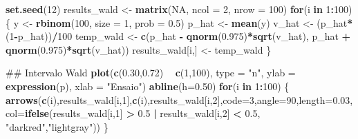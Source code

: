 \documentclass[10pt,a4paper]{book}
\newenvironment{Shaded}{\begin{snugshade}}{\end{snugshade}}
\newcommand{\KeywordTok}[1]{\textcolor[rgb]{0.13,0.29,0.53}{\textbf{#1}}}
\newcommand{\DataTypeTok}[1]{\textcolor[rgb]{0.13,0.29,0.53}{#1}}
\newcommand{\DecValTok}[1]{\textcolor[rgb]{0.00,0.00,0.81}{#1}}
\newcommand{\FloatTok}[1]{\textcolor[rgb]{0.00,0.00,0.81}{#1}}
\newcommand{\StringTok}[1]{\textcolor[rgb]{0.31,0.60,0.02}{#1}}
\newcommand{\OtherTok}[1]{\textcolor[rgb]{0.56,0.35,0.01}{#1}}
\newcommand{\ControlFlowTok}[1]{\textcolor[rgb]{0.13,0.29,0.53}{\textbf{#1}}}
\newcommand{\OperatorTok}[1]{\textcolor[rgb]{0.81,0.36,0.00}{\textbf{#1}}}
\newcommand{\NormalTok}[1]{#1}
\begin{document}
\begin{Shaded}
\begin{Highlighting}[]
\KeywordTok{set.seed}\NormalTok{(}\DecValTok{12}\NormalTok{)}
\NormalTok{results_wald <-}\StringTok{ }\KeywordTok{matrix}\NormalTok{(}\OtherTok{NA}\NormalTok{, }\DataTypeTok{ncol =} \DecValTok{2}\NormalTok{, }\DataTypeTok{nrow =} \DecValTok{100}\NormalTok{)}
\ControlFlowTok{for}\NormalTok{(i }\ControlFlowTok{in} \DecValTok{1}\OperatorTok{:}\DecValTok{100}\NormalTok{) \{}
\NormalTok{  y <-}\StringTok{ }\KeywordTok{rbinom}\NormalTok{(}\DecValTok{100}\NormalTok{, }\DataTypeTok{size =} \DecValTok{1}\NormalTok{, }\DataTypeTok{prob =} \FloatTok{0.5}\NormalTok{)}
\NormalTok{  p_hat <-}\StringTok{ }\KeywordTok{mean}\NormalTok{(y)}
\NormalTok{  v_hat <-}\StringTok{ }\NormalTok{(p_hat}\OperatorTok{*}\NormalTok{(}\DecValTok{1}\OperatorTok{-}\NormalTok{p_hat))}\OperatorTok{/}\DecValTok{100}
\NormalTok{  temp_wald <-}\StringTok{ }\KeywordTok{c}\NormalTok{(p_hat }\OperatorTok{-}\StringTok{  }\KeywordTok{qnorm}\NormalTok{(}\FloatTok{0.975}\NormalTok{)}\OperatorTok{*}\KeywordTok{sqrt}\NormalTok{(v_hat), p_hat }\OperatorTok{+}\StringTok{ }\KeywordTok{qnorm}\NormalTok{(}\FloatTok{0.975}\NormalTok{)}\OperatorTok{*}\KeywordTok{sqrt}\NormalTok{(v_hat))}
\NormalTok{  results_wald[i,] <-}\StringTok{ }\NormalTok{temp_wald}
\NormalTok{\}}

\NormalTok{## Intervalo Wald}
\KeywordTok{plot}\NormalTok{(}\KeywordTok{c}\NormalTok{(}\FloatTok{0.30}\NormalTok{,}\FloatTok{0.72}\NormalTok{) }\OperatorTok{~}\StringTok{ }\KeywordTok{c}\NormalTok{(}\DecValTok{1}\NormalTok{,}\DecValTok{100}\NormalTok{), }\DataTypeTok{type =} \StringTok{"n"}\NormalTok{, }\DataTypeTok{ylab =} \KeywordTok{expression}\NormalTok{(p), }\DataTypeTok{xlab =} \StringTok{"Ensaio"}\NormalTok{)}
\KeywordTok{abline}\NormalTok{(}\DataTypeTok{h=}\FloatTok{0.50}\NormalTok{)}
\ControlFlowTok{for}\NormalTok{(i }\ControlFlowTok{in} \DecValTok{1}\OperatorTok{:}\DecValTok{100}\NormalTok{) \{}
  \KeywordTok{arrows}\NormalTok{(}\KeywordTok{c}\NormalTok{(i),results_wald[i,}\DecValTok{1}\NormalTok{],}\KeywordTok{c}\NormalTok{(i),results_wald[i,}\DecValTok{2}\NormalTok{],}\DataTypeTok{code=}\DecValTok{3}\NormalTok{,}\DataTypeTok{angle=}\DecValTok{90}\NormalTok{,}\DataTypeTok{length=}\FloatTok{0.03}\NormalTok{,}
         \DataTypeTok{col=}\KeywordTok{ifelse}\NormalTok{(results_wald[i,}\DecValTok{1}\NormalTok{] }\OperatorTok{>}\StringTok{ }\FloatTok{0.5} \OperatorTok{|}\StringTok{ }\NormalTok{results_wald[i,}\DecValTok{2}\NormalTok{] }\OperatorTok{<}\StringTok{ }\FloatTok{0.5}\NormalTok{, }\StringTok{"darkred"}\NormalTok{,}\StringTok{"lightgray"}\NormalTok{))}
\NormalTok{\}}
\end{Highlighting}
\end{Shaded}
\end{document}
